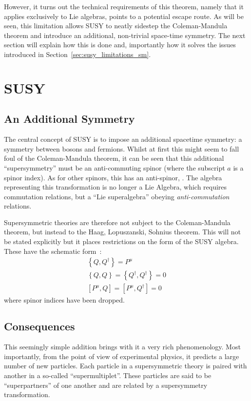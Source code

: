 However, it turns out the technical requirements of this theorem, namely that it
applies exclusively to Lie algebras, points to a potential escape route. As will
be seen, this limitation allows \acl{SUSY} to neatly sidestep the
Coleman-Mandula theorem and introduce an additional, non-trivial space-time
symmetry. The next section will explain how this is done and, importantly how it
solves the issues introduced in Section~\ref{sec:susy_limitations_sm}.

\section{\acl{SUSY}}
\subsection{An Additional Symmetry}
The central concept of \ac{SUSY} is to impose an additional spacetime symmetry:
a symmetry between bosons and fermions. Whilst at first this might seem to fall
foul of the Coleman-Mandula theorem, it can be seen that this additional
``supersymmetry'' must be an anti-commuting spinor \Qa (where the subscript $a$
is a spinor index). As for other spinors, this has an anti-spinor, \AQa. The
algebra representing this transformation is no longer a Lie Algebra, which
requires commutation relations, but a ``Lie superalgebra'' obeying
\emph{anti-commutation} relations.

Supersymmetric theories are therefore not subject to the Coleman-Mandula
theorem, but instead to the Haag, Lopuszanski, Sohnius theorem. This will not be
stated explicitly but it places restrictions on the form of the \ac{SUSY}
algebra. These have the schematic form~\cite{susy_primer}:
\begin{eqnarray}
\left\{Q,Q^{\dagger}\right\} = P^{\mu}\\
\left\{Q,Q\right\} = \left\{Q^{\dagger}, Q^{\dagger}\right\} = 0\\
\left[P^{\mu}, Q\right] = \left[P^{\mu}, Q^{\dagger}\right] = 0\label{eqn:susy_commutator}
\end{eqnarray}
where spinor indices have been dropped.

\subsection{Consequences}
\label{sec:consequences}
This seemingly simple addition brings with it a very rich phenomenology. Most
importantly, from the point of view of experimental physics, it predicts a large
number of new particles. Each particle in a supersymmetric theory is paired with
another in a so-called ``supermultiplet''. These particles are said to be
``superpartners'' of one another and are related by a supersymmetry
transformation.


